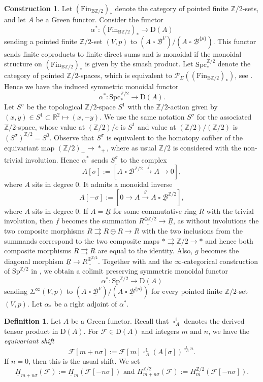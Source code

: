 \documentclass[10pt]{amsart}
\theoremstyle{definition}
\newtheorem{df}[thm]{Definition}
\newtheorem{const}[thm]{Construction}
\numberwithin{equation}{section}
\renewcommand{\L}{\mathbb{L}}
\newcommand{\R}{\mathbb{R}}
\newcommand{\Z}{\mathbb{Z}}
\newcommand{\cB}{\mathcal{B}}
\newcommand{\cF}{\mathcal{F}}
\newcommand{\cP}{\mathcal{P}}
\newcommand{\rB}{\mathrm{B}}
\newcommand{\rD}{\mathrm{D}}
\newcommand{\ul}{\underline}
\newcommand{\Sp}{\mathrm{Sp}}
\newcommand{\Fin}{\mathrm{Fin}}
\newcommand{\Spc}{\mathrm{Spc}}
\DeclareMathOperator{\sotimes}{\square}
\begin{document}
\begin{const}\label{alphaupperstar}
Let $(\Fin_{\rB \Z/2})_*$ denote the category of pointed finite $\Z/2$-sets, and let $A$ be a Green functor.
Consider the functor
\[
\alpha^*\colon (\Fin_{\rB \Z/2})_*
\to
\rD(A)
\]
sending a pointed finite $\Z/2$-set $(V,p)$ to
$(A\sotimes \ul{\cB}^V) / (A \sotimes \ul{\cB}^{\{p\}})$.
This functor sends finite coproducts to finite direct sums and is monoidal if the monoidal structure on $(\Fin_{\rB \Z/2})_*$ is given by the smash product.
Let $\Spc^{\Z/2}_*$ denote the category of pointed $\Z/2$-spaces,
which is equivalent to $\cP_{\Sigma}((\Fin_{\rB \Z/2})_*)$,
see \cite[Lemma 2.2, section 9.2]{BH21}.
Hence we have the induced symmetric monoidal functor
\[
\alpha^*\colon 
\Spc^{\Z/2}_*
\to
\rD(A).
\]
Let $S^\sigma$ be the topological $\Z/2$-space $S^1$ with the $\Z/2$-action given by $(x,y)\in S^1\subset \R^2\mapsto (x,-y)$.
We use the same notation $S^\sigma$ for the associated $\Z/2$-space,
whose value at $(\Z/2)/e$ is $S^1$ and value at $(\Z/2)/(\Z/2)$ is $(S^\sigma)^{\Z/2}=S^0$.
Observe that $S^\sigma$ is equivalent to the homotopy cofiber of the
equivariant map $(\Z/2)_+\to *_+$,
where as usual $\Z/2$ is considered with the non-trivial involution.
Hence $\alpha^*$ sends $S^\sigma$  
to the complex
\[
A[\sigma]:=[A\sotimes \ul{\cB}^{\Z/2}\xrightarrow{f} A\to 0],
\] 
where $A$ sits in degree $0$. 
It admits a monoidal inverse
\[
A[-\sigma]
:=
[0\to A\xrightarrow{g} A\sotimes \ul{\cB}^{\Z/2}],
\]
where $A$ sits in degree $0$.
If $A=\ul{R}$ for some commutative ring $R$ with the trivial involution,
then $f$ becomes the summation $\ul{R^{\oplus \Z/2}}\to \ul{R}$,  as without  involutions the two composite morphisms $R\rightrightarrows R\oplus R\to R$ with the two inclusions from the summands correspond to the
two composite maps $*\rightrightarrows \Z/2\to *$ and hence both composite morphisms $R\rightrightarrows R$ are equal to the identity. Also, $g$ becomes the diagonal morphism $\ul{R}\to \ul{R^{\oplus^{\Z/2}}}$.
Together with \cite[Proposition 2.9(1)]{Rob15} and the $\infty$-categorical construction of $\Sp^{\Z/2}$ in \cite[section 9.2]{BH21},
we obtain a colimit preserving symmetric monoidal functor
\[
\alpha^*
\colon
\Sp^{\Z/2}
\to
\rD(A)
\]
sending $\Sigma^\infty (V,p)$ to $(A\sotimes \ul{\cB}^V) / (A \sotimes \ul{\cB}^{\{p\}})$ for every pointed finite $\Z/2$-set $(V,p)$.
Let $\alpha_*$ be a right adjoint of $\alpha^*$.
\end{const}



\begin{df}\label{defshiftabelian}
Let $A$ be a Green functor.
Recall that $\sotimes_{A}^\L$ denotes the derived tensor product in $\rD(A)$.
For $\cF\in \rD(A)$ and integers $m$ and $n$,
we have the \emph{equivariant shift}
\[
\cF[m+n\sigma]
:=
\cF[m] \sotimes_{A}^\L (A[\sigma])^{\sotimes_A^\L n}.
\]
If $n=0$, then this is the usual shift.
We set
\[
\ul{H}_{m+n\sigma}(\cF)
:=
\ul{H}_m(\cF[-n\sigma])
\text{ and }
H_{m+n\sigma}^{\Z/2}(\cF)
:=
H_m^{\Z/2}(\cF[-n\sigma]).
\]
\end{df}
\end{document}
